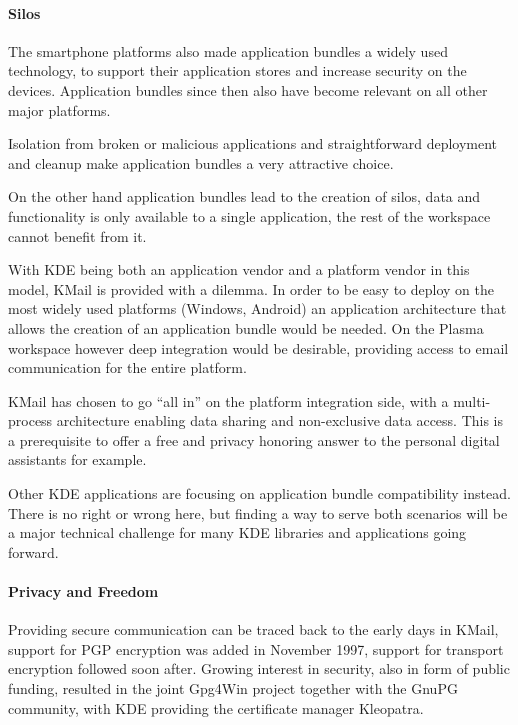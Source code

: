 \paragraph{Silos}

The smartphone platforms also made application bundles a widely used technology, to support their application stores and increase security on the devices. Application bundles since then also have become relevant on all other major platforms.

Isolation from broken or malicious applications and straightforward deployment and cleanup make application bundles a very attractive choice.

On the other hand application bundles lead to the creation of silos, data and functionality is only available to a single application, the rest of the workspace cannot benefit from it.

With KDE being both an application vendor and a platform vendor in this model, KMail is provided with a dilemma. In order to be easy to deploy on the most widely used platforms (Windows, Android) an application architecture that allows the creation of an application bundle would be needed. On the Plasma workspace however deep integration would be desirable, providing access to email communication for the entire platform.

KMail has chosen to go “all in” on the platform integration side, with a multi-process architecture enabling data sharing and non-exclusive data access. This is a prerequisite to offer a free and privacy honoring answer to the personal digital assistants for example.

Other KDE applications are focusing on application bundle compatibility instead. There is no right or wrong here, but finding a way to serve both scenarios will be a major technical challenge for many KDE libraries and applications going forward.

\paragraph{Privacy and Freedom}

Providing secure communication can be traced back to the early days in KMail, support for PGP encryption was added in November 1997, support for transport encryption followed soon after. Growing interest in security, also in form of public funding, resulted in the joint Gpg4Win project together with the GnuPG community, with KDE providing the certificate manager Kleopatra.

